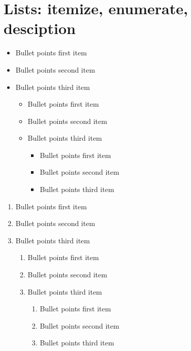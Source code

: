 \documentclass{enisareport}
\theoremstyle{plain}
\theoremstyle{definition}
\begin{document}
\lipsum[4][3]


\clearpage

\section{Lists: itemize, enumerate, desciption}

\lipsum[5]
    
\begin{itemize}
  \item Bullet points first item
  \item Bullet points second item
  \item Bullet points third item
    \begin{itemize}
    \item Bullet points first item
    \item Bullet points second item
    \item Bullet points third item
      \begin{itemize}
      \item Bullet points first item
      \item Bullet points second item
      \item Bullet points third item
      \end{itemize}
     \end{itemize}
 \end{itemize}

\begin{enumerate}
  \item Bullet points first item
  \item Bullet points second item
  \item Bullet points third item
    \begin{enumerate}
    \item Bullet points first item
    \item Bullet points second item
    \item Bullet points third item
      \begin{enumerate}
      \item Bullet points first item
      \item Bullet points second item
      \item Bullet points third item
      \end{enumerate}
     \end{enumerate}
 \end{enumerate}
\end{document}
